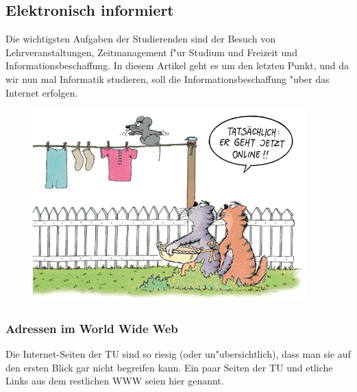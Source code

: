 \subsection{Elektronisch informiert}

Die wichtigsten Aufgaben der Studierenden sind der Besuch von
Lehrveranstaltungen, Zeitmanagement f"ur Studium und Freizeit und
Informationsbeschaffung. In diesem Artikel geht es um den letzten Punkt, und da
wir nun mal Informatik studieren, soll die Informationsbeschaffung "uber das
Internet erfolgen.

\begin{figure}[h]
  \centering\includegraphics[width = \linewidth]{bilder/comics/stein1.png}
\end{figure}

\subsubsection*{Adressen im World Wide Web}

Die Internet-Seiten der TU sind so riesig (oder un"ubersichtlich), dass man sie
auf den ersten Blick gar nicht begreifen kann. Ein paar Seiten der TU und
etliche Links aus dem restlichen WWW seien hier genannt.

